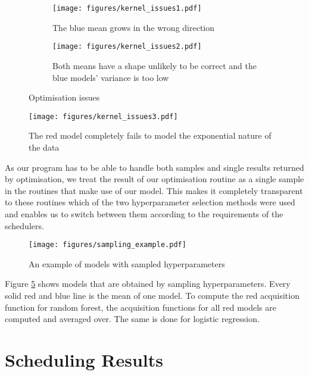 \documentclass[a4paper,12pt,twoside,openright]{report}
\begin{document}
\begin{figure}
\centering
\begin{subfigure}{.45\textwidth}
  \centering
  \texttt{[image: figures/kernel\_issues1.pdf]}
\caption{The blue mean grows in the wrong direction}
  \label{kernel_issues1}
\end{subfigure}%
\begin{subfigure}{.45\textwidth}
  \centering
  \texttt{[image: figures/kernel\_issues2.pdf]}
  \caption{Both means have a shape unlikely to be correct and the blue models' variance is too low}
  \label{kernel_issues2}
\end{subfigure}
\caption{Optimisation issues}
\label{kernel_issues_big1}
\end{figure}

\begin{figure}
\centering
  \texttt{[image: figures/kernel\_issues3.pdf]}
  \caption{The red model completely fails to model the exponential nature of the data}
  \label{kernel_issues3}
\end{figure}

As our program has to be able to handle both samples and single results returned by optimisation, we treat the result of our optimisation routine as a single sample in the routines that make use of our model. This makes it completely transparent to these routines which of the two hyperparameter selection methods were used and enables us to switch between them according to the requirements of the schedulers.

\begin{figure}
\centering
  \texttt{[image: figures/sampling\_example.pdf]}
  \caption{An example of models with sampled hyperparameters}
  \label{sampling_example}
\end{figure}

Figure \ref{sampling_example} shows models that are obtained by sampling hyperparameters. Every solid red and blue line is the mean of one model. To compute the red acquisition function for random forest, the acquisition functions for all red models are computed and averaged over. The same is done for logistic regression.

\section{Scheduling Results}
\end{document}
